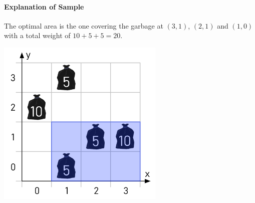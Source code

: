 \paragraph{Explanation of Sample}
The optimal area is the one covering the garbage at $(3,1)$, $(2,1)$ and $(1,0)$ with a total weight of $10 + 5 + 5 = 20$.

\begin{center}
\includegraphics[width=0.6\textwidth]{Figure1.png}
\end{center}
